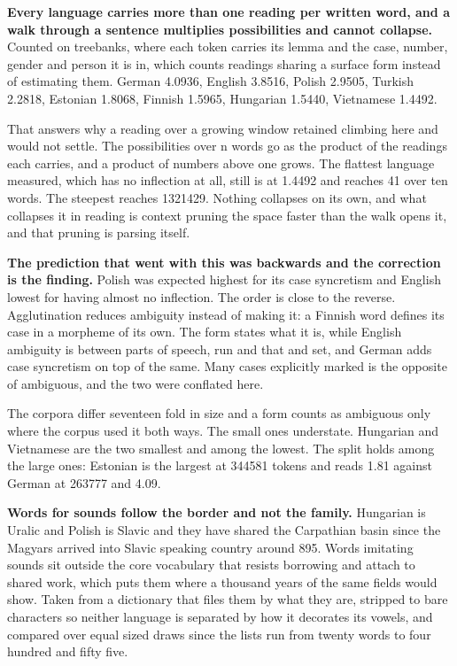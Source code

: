 \textbf{Every language carries more than one reading per written word, and a walk through a sentence multiplies possibilities and cannot collapse.} Counted on treebanks, where each token carries its lemma and the case, number, gender and person it is in, which counts readings sharing a surface form instead of estimating them. German 4.0936, English 3.8516, Polish 2.9505, Turkish 2.2818, Estonian 1.8068, Finnish 1.5965, Hungarian 1.5440, Vietnamese 1.4492.

That answers why a reading over a growing window retained climbing here and would not settle. The possibilities over n words go as the product of the readings each carries, and a product of numbers above one grows. The flattest language measured, which has no inflection at all, still is at 1.4492 and reaches 41 over ten words. The steepest reaches 1321429. Nothing collapses on its own, and what collapses it in reading is context pruning the space faster than the walk opens it, and that pruning is parsing itself.

\textbf{The prediction that went with this was backwards and the correction is the finding.} Polish was expected highest for its case syncretism and English lowest for having almost no inflection. The order is close to the reverse. Agglutination reduces ambiguity instead of making it: a Finnish word defines its case in a morpheme of its own. The form states what it is, while English ambiguity is between parts of speech, run and that and set, and German adds case syncretism on top of the same. Many cases explicitly marked is the opposite of ambiguous, and the two were conflated here.

The corpora differ seventeen fold in size and a form counts as ambiguous only where the corpus used it both ways. The small ones understate. Hungarian and Vietnamese are the two smallest and among the lowest. The split holds among the large ones: Estonian is the largest at 344581 tokens and reads 1.81 against German at 263777 and 4.09.

\textbf{Words for sounds follow the border and not the family.} Hungarian is Uralic and Polish is Slavic and they have shared the Carpathian basin since the Magyars arrived into Slavic speaking country around 895. Words imitating sounds sit outside the core vocabulary that resists borrowing and attach to shared work, which puts them where a thousand years of the same fields would show. Taken from a dictionary that files them by what they are, stripped to bare characters so neither language is separated by how it decorates its vowels, and compared over equal sized draws since the lists run from twenty words to four hundred and fifty five.

